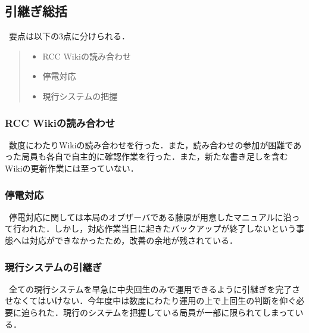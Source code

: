 \subsection*{引継ぎ総括}


\ 要点は以下の3点に分けられる．
\begin{quote}
 \begin{itemize}
\item RCC Wikiの読み合わせ
\item 停電対応
\item 現行システムの把握
 \end{itemize}
\end{quote}
\subsubsection* {RCC Wikiの読み合わせ}
\ 数度にわたりWikiの読み合わせを行った．また，読み合わせの参加が困難であった局員も各自で自主的に確認作業を行った．また，新たな書き足しを含むWikiの更新作業には至っていない．
\subsubsection* {停電対応}
\ 停電対応に関しては本局のオブザーバである藤原が用意したマニュアルに沿って行われた．しかし，対応作業当日に起きたバックアップが終了しないという事態へは対応ができなかったため，改善の余地が残されている．
\subsubsection* {現行システムの引継ぎ}
\ 全ての現行システムを早急に中央回生のみで運用できるように引継ぎを完了させなくてはいけない．今年度中は数度にわたり運用の上で上回生の判断を仰ぐ必要に迫られた．現行のシステムを把握している局員が一部に限られてしまっている．

